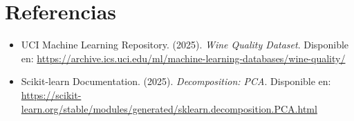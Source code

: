 \documentclass[12pt]{article}
\begin{document}
\section{Referencias}
\begin{itemize}
    \item UCI Machine Learning Repository. (2025). \textit{Wine Quality Dataset}. Disponible en: \url{https://archive.ics.uci.edu/ml/machine-learning-databases/wine-quality/}
    \item Scikit-learn Documentation. (2025). \textit{Decomposition: PCA}. Disponible en: \url{https://scikit-learn.org/stable/modules/generated/sklearn.decomposition.PCA.html}
\end{itemize}
\end{document}
